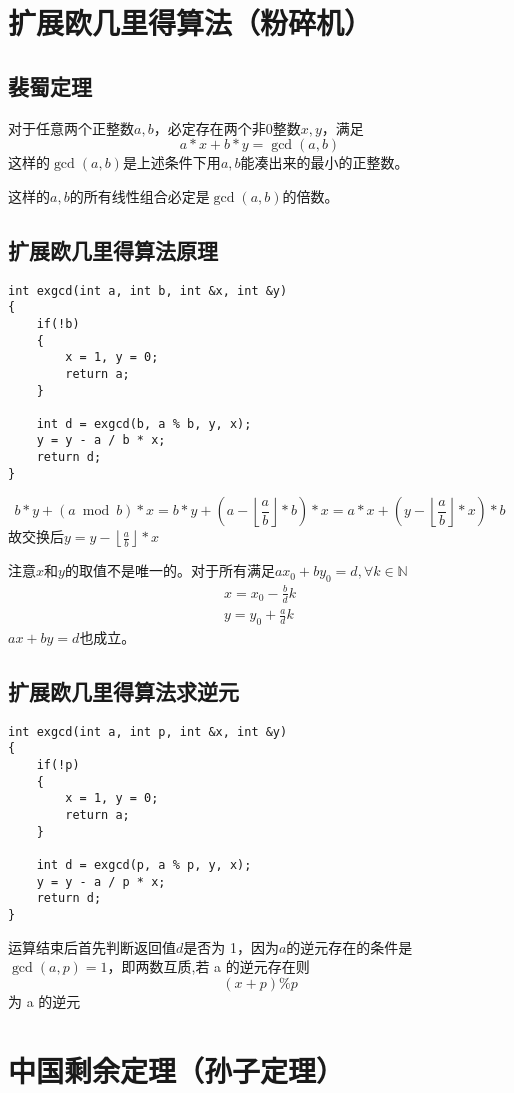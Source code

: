 \documentclass[]{book}
\begin{document}
\chapter{扩展欧几里得算法（粉碎机）}
\section{裴蜀定理}
对于任意两个正整数$a,b$，必定存在两个非0整数$x,y$，满足
\[a * x + b * y = \gcd(a, b)\]
这样的$\gcd(a,b)$是上述条件下用$a,b$能凑出来的最小的正整数。

这样的$a,b$的所有线性组合必定是$\gcd(a,b)$的倍数。
\section{扩展欧几里得算法原理}
\begin{lstlisting}
int exgcd(int a, int b, int &x, int &y)
{
    if(!b)
    {
        x = 1, y = 0;
        return a;
    }
    
    int d = exgcd(b, a % b, y, x);
    y = y - a / b * x;
    return d;
}
\end{lstlisting}
\[b*y + (a\bmod b)*x = b*y + (a-\left\lfloor \frac{a}{b}\right\rfloor * b)*x = a*x + (y - \left\lfloor \frac{a}{b}\right\rfloor *x)*b\]
故交换后$y = y - \left\lfloor \frac{a}{b}\right\rfloor * x$

注意$x$和$y$的取值不是唯一的。对于所有满足$ax_{0}+by_{0} = d,\forall k \in \mathbb{N}$
$$
\begin{matrix} 
    x=x_{0} - \frac{b}{d}k \\  
    y=y_{0} + \frac{a}{d}k 
\end{matrix}
$$
$ax+by=d$也成立。
\section{扩展欧几里得算法求逆元}
\begin{lstlisting}
int exgcd(int a, int p, int &x, int &y)
{
    if(!p)
    {
        x = 1, y = 0;
        return a;
    }
    
    int d = exgcd(p, a % p, y, x);
    y = y - a / p * x;
    return d;
}
\end{lstlisting}
运算结束后首先判断返回值$d$是否为 1，因为$a$的逆元存在的条件是 $\gcd(a, p) = 1$，即两数互质,若 a 的逆元存在则
\[(x + p) \% p\]
为 a 的逆元
\chapter{中国剩余定理（孙子定理）}
\end{document}
